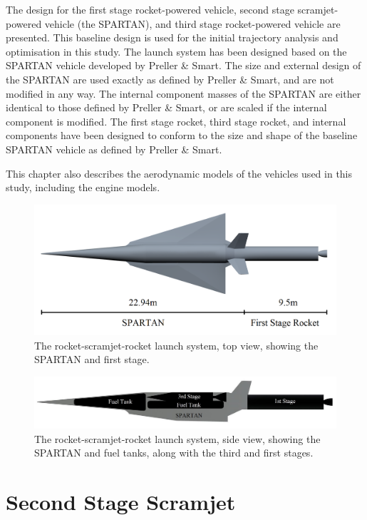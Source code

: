 The design for the first stage rocket-powered vehicle, second stage scramjet-powered vehicle (the SPARTAN), and third stage rocket-powered vehicle are presented. This baseline design is used for the initial trajectory analysis and optimisation in this study. The launch system has been designed based on the SPARTAN vehicle developed by Preller \& Smart. The size and external design of the SPARTAN are used exactly as defined by Preller \& Smart, and are not modified in any way. The internal component masses of the SPARTAN are either identical to those defined by Preller \& Smart, or are scaled if the internal component is modified. The first stage rocket, third stage rocket, and internal components have been designed to conform to the size and shape of the baseline SPARTAN vehicle as defined by Preller \& Smart.

This chapter also describes the aerodynamic models of the vehicles used in this study, including the engine models.


\begin{figure}
\centering
\includegraphics[width=0.7\linewidth]{figures/3_vehicle_design/NoInternal}
\caption{The rocket-scramjet-rocket launch system, top view, showing the SPARTAN and first stage.}
\label{fig:NoInternal}
\end{figure}

\begin{figure}
\centering
\includegraphics[width=0.7\linewidth]{figures/3_vehicle_design/INTERNALS}
\caption{The rocket-scramjet-rocket launch system, side view, showing the SPARTAN and fuel tanks, along with the third and first stages.}
\label{fig:INTERNALS}
\end{figure}



	
	
	\section{Second Stage Scramjet}
